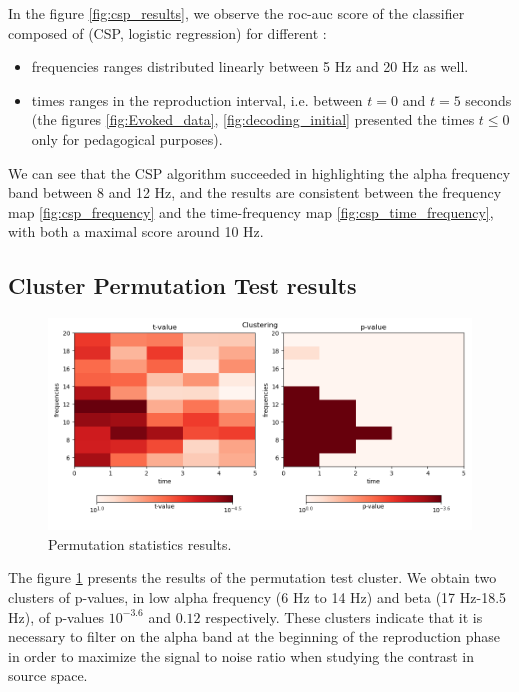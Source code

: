 
In the figure \ref{fig:csp_results}, we observe the roc-auc score of the classifier composed of (CSP, logistic regression) for different :

\begin{itemize}
    \item frequencies ranges distributed linearly between 5 Hz and 20 Hz as well.
    \item times ranges in the reproduction interval, i.e. between $t=0$ and $t=5$ seconds (the figures \ref{fig:Evoked_data}, \ref{fig:decoding_initial} presented the times $t \leq 0$ only for pedagogical purposes).
\end{itemize}

We can see that the CSP algorithm succeeded in highlighting the alpha frequency band between 8 and 12 Hz, and the results are consistent between the frequency map \ref{fig:csp_frequency} and the time-frequency map \ref{fig:csp_time_frequency}, with both a maximal score around 10 Hz.

\subsection{Cluster Permutation Test results}

\begin{figure}[ht]
    \centering
    \includegraphics[width=15cm]{images_report/sensor/csp_permutation_res/permutations_test.png}
    \caption[Permutation statistics results.]%
    {Permutation statistics results.}
    \label{permutation_statistics_results}
\end{figure}

The figure \ref{permutation_statistics_results} presents the results of the permutation test cluster. We obtain two clusters of p-values, in low alpha frequency (6 Hz to 14 Hz) and beta (17 Hz-18.5 Hz), of p-values $10^{-3.6}$ and $0.12$ respectively. These clusters indicate that it is necessary to filter on the alpha band at the beginning of the reproduction phase in order to maximize the signal to noise ratio when studying the contrast in source space.


